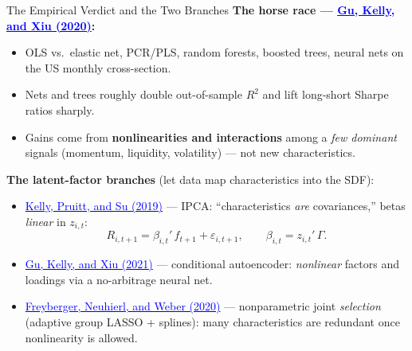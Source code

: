 \documentclass{beamer}
\begin{document}
\begin{frame}{The Empirical Verdict and the Two Branches}
\textbf{The horse race --- \href{https://doi.org/10.1093/rfs/hhaa009}{\textcolor{blue}{Gu, Kelly, and Xiu (2020)}}:}
\begin{itemize}
  \item OLS vs.\ elastic net, PCR/PLS, random forests, boosted trees, neural nets on the US monthly cross-section.
  \item Nets and trees roughly \alert{double} out-of-sample $R^2$ and lift long-short Sharpe ratios sharply.
  \item Gains come from \textbf{nonlinearities and interactions} among a \emph{few dominant} signals (momentum, liquidity, volatility) --- not new characteristics.
\end{itemize}
\textbf{The latent-factor branches} (let data map characteristics into the SDF):
\begin{itemize}
  \item \href{https://doi.org/10.1016/j.jfineco.2019.05.001}{\textcolor{blue}{Kelly, Pruitt, and Su (2019)}} --- \alert{IPCA}: ``characteristics \emph{are} covariances,'' betas \emph{linear} in $z_{i,t}$:
  \begin{equation*}
    R_{i,t+1} = \beta_{i,t}'\, f_{t+1} + \varepsilon_{i,t+1}, \qquad \beta_{i,t} = z_{i,t}'\,\Gamma .
  \end{equation*}
  \item \href{https://doi.org/10.1016/j.jeconom.2020.07.009}{\textcolor{blue}{Gu, Kelly, and Xiu (2021)}} --- \alert{conditional autoencoder}: \emph{nonlinear} factors and loadings via a no-arbitrage neural net.
  \item \href{https://doi.org/10.1093/rfs/hhz123}{\textcolor{blue}{Freyberger, Neuhierl, and Weber (2020)}} --- nonparametric joint \emph{selection} (adaptive group LASSO + splines): many characteristics are redundant once nonlinearity is allowed.
\end{itemize}
\end{frame}
\end{document}
